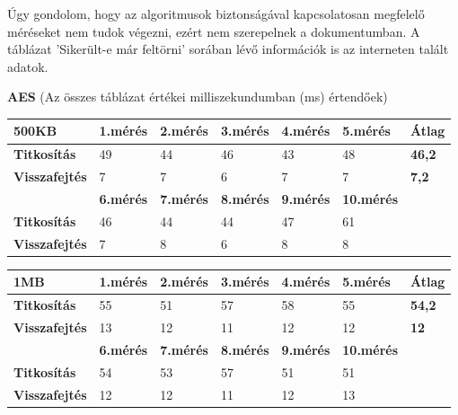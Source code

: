 Úgy gondolom, hogy az algoritmusok biztonságával kapcsolatosan megfelelő méréseket nem tudok végezni, ezért nem szerepelnek a dokumentumban. A táblázat ’Sikerült-e már feltörni’ sorában lévő információk is az interneten talált adatok.\newline

\newpage \noindent \textbf{AES} (Az összes táblázat értékei milliszekundumban (ms) értendőek)

\begin{center}
	
	
	\begin{tabular}{|p{2.4cm}|p{1.7cm}|p{1.7cm}|p{1.7cm}|p{1.7cm}|p{1.8cm}|p{1.2cm}|}
		\hline
		\textbf{500KB} & \textbf{1.mérés} & \textbf{2.mérés} & \textbf{3.mérés} & \textbf{4.mérés} & \textbf{5.mérés} & \textbf{Átlag} \\
		\hline
		\textbf{Titkosítás} & 49 & 44 & 46 & 43 & 48 & \textbf{46,2} \\
		\hline
		\textbf{Visszafejtés} & 7 & 7 & 6 & 7 & 7 & \textbf{7,2} \\
		\hline
		 & \textbf{6.mérés} & \textbf{7.mérés} & \textbf{8.mérés} & \textbf{9.mérés} & \textbf{10.mérés} & \\
		 \hline
		 \textbf{Titkosítás} & 46 & 44 & 44 & 47 & 61 & \\
		 \hline
		 \textbf{Visszafejtés} & 7 & 8 & 6 & 8 & 8 &\\
		 \hline
	\end{tabular}
\end{center}

\begin{center}
	
	
	\begin{tabular}{|p{2.4cm}|p{1.7cm}|p{1.7cm}|p{1.7cm}|p{1.7cm}|p{1.8cm}|p{1.2cm}|}
		\hline
		\textbf{1MB} & \textbf{1.mérés} & \textbf{2.mérés} & \textbf{3.mérés} & \textbf{4.mérés} & \textbf{5.mérés} & \textbf{Átlag} \\
		\hline
		\textbf{Titkosítás} & 55 & 51 & 57 & 58 & 55 &\textbf{54,2} \\
		\hline
		\textbf{Visszafejtés} &13 & 12 & 11 & 12 & 12 &	\textbf{12}  \\
		\hline
		& \textbf{6.mérés} & \textbf{7.mérés} & \textbf{8.mérés} & \textbf{9.mérés} & \textbf{10.mérés} & \\
		\hline
		\textbf{Titkosítás} & 54 & 53 & 57 & 51 & 51 & \\
		\hline
		\textbf{Visszafejtés} & 12 & 12 & 11 & 12 & 13 & \\
		\hline
	\end{tabular}
\end{center}

